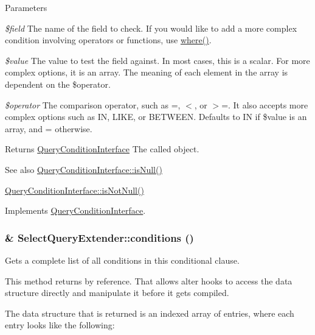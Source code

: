 \begin{DoxyParams}{Parameters}
\item[{\em \$field}]The name of the field to check. If you would like to add a more complex condition involving operators or functions, use \hyperlink{classSelectQueryExtender_a7ac93a5b39a4b816e95b9c2d588ba45a}{where()}. \item[{\em \$value}]The value to test the field against. In most cases, this is a scalar. For more complex options, it is an array. The meaning of each element in the array is dependent on the \$operator. \item[{\em \$operator}]The comparison operator, such as =, $<$, or $>$=. It also accepts more complex options such as IN, LIKE, or BETWEEN. Defaults to IN if \$value is an array, and = otherwise.\end{DoxyParams}
\begin{DoxyReturn}{Returns}
\hyperlink{interfaceQueryConditionInterface}{QueryConditionInterface} The called object.
\end{DoxyReturn}
\begin{DoxySeeAlso}{See also}
\hyperlink{interfaceQueryConditionInterface_a2978b536a3fe62b21e940366c9cb5923}{QueryConditionInterface::isNull()} 

\hyperlink{interfaceQueryConditionInterface_a8bbb6acc9c72911b165cf6eb1dc31453}{QueryConditionInterface::isNotNull()} 
\end{DoxySeeAlso}


Implements \hyperlink{interfaceQueryConditionInterface_aa6d9d96fa17441b5222d1ffddd4c1799}{QueryConditionInterface}.\hypertarget{classSelectQueryExtender_a3d3779c339d6bb794e9c98dc361c07e4}{
\subsubsection[{conditions}]{\setlength{\rightskip}{0pt plus 5cm}\& SelectQueryExtender::conditions ()}}
\label{classSelectQueryExtender_a3d3779c339d6bb794e9c98dc361c07e4}
Gets a complete list of all conditions in this conditional clause.

This method returns by reference. That allows alter hooks to access the data structure directly and manipulate it before it gets compiled.

The data structure that is returned is an indexed array of entries, where each entry looks like the following: 


